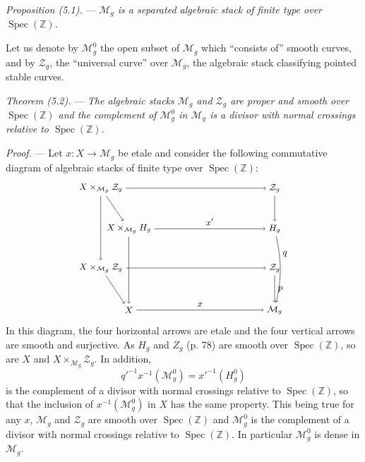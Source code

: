 \documentclass[10pt]{article}
\newcommand{\Spec}{\operatorname{Spec}}
\begin{document}
\medskip
\noindent\emph{Proposition (5.1).} --- \emph{$\mathcal M_g$ is a separated algebraic stack of finite type over $\Spec(\mathbb Z)$.}

Let us denote by $\mathcal M_g^0$ the open subset of $\mathcal M_g$ which ``consists of'' smooth curves, and by $\mathcal Z_g$, the ``universal curve'' over $\mathcal M_g$, the algebraic stack classifying pointed stable curves.

\medskip
\noindent\emph{Theorem (5.2).} --- \emph{The algebraic stacks $\mathcal M_g$ and $\mathcal Z_g$ are proper and smooth over $\Spec(\mathbb Z)$ and the complement of $\mathcal M_g^0$ in $\mathcal M_g$ is a divisor with normal crossings relative to $\Spec(\mathbb Z)$.}

\noindent\emph{Proof.} --- Let $x:X\to\mathcal M_g$ be etale and consider the following commutative diagram of algebraic stacks of finite type over $\Spec(\mathbb Z)$:
\[
\begin{tikzpicture}[baseline=(current bounding box.center), x=1cm, y=1cm, every node/.style={font=\small}]
\node (A) at (0,3.6) {$X\times_{\mathcal M_g}\mathcal Z_g$};
\node (B) at (6.2,3.6) {$\mathcal Z_g$};
\node (C) at (1.0,2.15) {$X\times_{\mathcal M_g}H_g$};
\node (D) at (6.2,2.15) {$H_g$};
\node (E) at (0,0.75) {$X\times_{\mathcal M_g}\mathcal Z_g$};
\node (F) at (6.2,0.75) {$\mathcal Z_g$};
\node (G) at (1.0,-0.75) {$X$};
\node (H) at (6.2,-0.75) {$\mathcal M_g$};
\draw[->] (A) -- (B);
\draw[->] (C) -- node[above] {$x'$} (D);
\draw[->] (E) -- (F);
\draw[->] (G) -- node[above] {$x$} (H);
\draw[->] (A) -- (E);
\draw[->] (B) -- (D);
\draw[->] (D) to[bend left=12] node[pos=0.25,right] {$q$} (H);
\draw[->] (F) -- node[right] {$p$} (H);
\draw[->] (A) -- (C);
\draw[->] (C) -- (G);
\draw[->] (E) -- (G);
\end{tikzpicture}
\]
In this diagram, the four horizontal arrows are etale and the four vertical arrows are smooth and surjective. As $H_g$ and $Z_g$ (p. 78) are smooth over $\Spec(\mathbb Z)$, so are $X$ and $X\times_{\mathcal M_g}\mathcal Z_g$. In addition,
\[
q'^{-1}x^{-1}(\mathcal M_g^0)=x'^{-1}(H_g^0)
\]
is the complement of a divisor with normal crossings relative to $\Spec(\mathbb Z)$, so that the inclusion of $x^{-1}(\mathcal M_g^0)$ in $X$ has the same property. This being true for any $x$, $\mathcal M_g$ and $\mathcal Z_g$ are smooth over $\Spec(\mathbb Z)$ and $\mathcal M_g^0$ is the complement of a divisor with normal crossings relative to $\Spec(\mathbb Z)$. In particular $\mathcal M_g^0$ is dense in $\mathcal M_g$.
\end{document}
